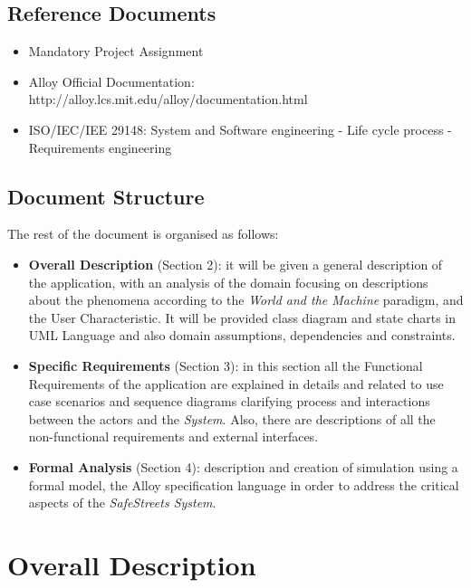 \documentclass {article}
\begin{document}
	\subsection{Reference Documents}
		
		\begin{itemize}
			 \item Mandatory Project Assignment
			 \item Alloy Official Documentation: http://alloy.lcs.mit.edu/alloy/documentation.html
			 \item ISO/IEC/IEE 29148: System and Software engineering - Life cycle process - Requirements engineering
		\end{itemize}

	\subsection{Document Structure}
			The rest of the document is organised as follows:
				\begin{itemize}
					\item {\bf Overall Description} (Section 2): it will be given a general description of the application, with an analysis of the domain focusing on descriptions about the phenomena according to the {\it World and the Machine} paradigm, and the User Characteristic. It will be provided class diagram and state charts in UML Language and also domain assumptions, dependencies and constraints.
					\item {\bf Specific Requirements} (Section 3): in this section all the Functional Requirements of the application are explained in details and related to use case scenarios and sequence diagrams clarifying process and interactions between the actors and the {\it System}. Also, there are descriptions of all the non-functional requirements and external interfaces.
					\item {\bf Formal Analysis} (Section 4): description and creation of simulation using a formal model, the Alloy specification language in order to address the critical aspects of the {\it SafeStreets System}.				
					\end{itemize}

\pagebreak	
	
\section{Overall Description}
\end{document}
